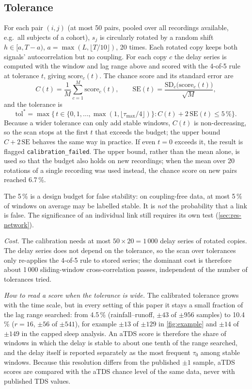 \documentclass[11pt,a4paper]{article}
\begin{document}
\subsection{Tolerance}
\label{sec:tol}
For each pair $(i, j)$ (at most 50 pairs, pooled over all recordings available, e.g.\ all subjects of a cohort), $s_j$ is circularly rotated by a random shift $h \in [a, T - a)$, $a = \max(L, \lfloor T/10 \rfloor)$, 20 times. Each rotated copy keeps both signals' autocorrelation but no coupling. For each copy $c$ the delay series is computed with the window and lag range above and scored with the 4-of-5 rule at tolerance $t$, giving $\mathrm{score}_c(t)$. The chance score and its standard error are
\begin{equation}
C(t) = \frac{1}{M}\sum_{c=1}^{M} \mathrm{score}_c(t), \qquad \mathrm{SE}(t) = \frac{\mathrm{SD}_c\big(\mathrm{score}_c(t)\big)}{\sqrt{M}} ,
\end{equation}
and the tolerance is
\begin{equation}
\mathrm{tol}^\ast = \max\big\{\, t \in \{0, 1, \dots, \max(1, \lfloor\tau_{\max}/4\rfloor)\} : C(t) + 2\,\mathrm{SE}(t) \le 5\,\% \big\}.
\label{eq:tol}
\end{equation}
Because a wider tolerance can only add stable windows, $C(t)$ is non-decreasing, so the scan stops at the first $t$ that exceeds the budget; the upper bound $C + 2\,\mathrm{SE}$ behaves the same way in practice. If even $t = 0$ exceeds it, the result is flagged \texttt{calibration\_failed}. The upper bound, rather than the mean alone, is used so that the budget also holds on new recordings; when the mean over 20 rotations of a single recording was used instead, the chance score on new pairs reached 6.7\,\%.

The 5\,\% is a design budget for false stability: on coupling-free data, at most 5\,\% of windows on average may be labelled stable. It is \emph{not} the probability that a link is false. The significance of an individual link still requires its own test (\cref{sec:res-network}).

\emph{Cost.} The calibration needs at most $50 \times 20 = 1\,000$ delay series of rotated copies. The delay series does not depend on the tolerance, so the scan over tolerances only re-applies the 4-of-5 rule to stored series; the dominant cost is therefore about 1\,000 sliding-window cross-correlation passes, independent of the number of tolerances tried.

\emph{How to read a score when the tolerance is wide.} The calibrated tolerance grows with the time scale, but in every setting of this paper it stays a small fraction of the lag range searched: from 4.5\,\% (rainfall--runoff, $\pm43$ of $\pm956$ samples) to 10.4\,\% ($r = 16$, $\pm56$ of $\pm541$), for example $\pm13$ of $\pm129$ in \cref{fig:example} and $\pm14$ of $\pm149$ in the capped sleep analysis. An aTDS score is therefore the share of windows in which the delay is stable to about one tenth of the range searched, and the delay itself is reported separately as the most frequent $\tau_0$ among stable windows. Because this resolution differs from the published $\pm1$ sample, aTDS scores are compared with the aTDS chance level of the same data, never with published TDS values.
\end{document}
